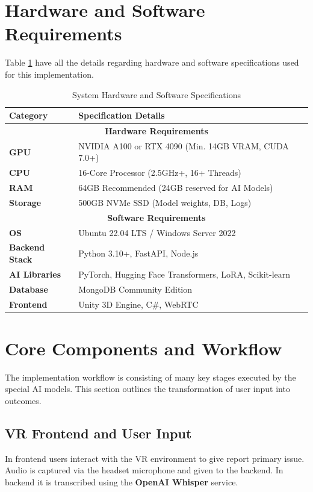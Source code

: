 \section{Hardware and Software Requirements}
Table \ref{tab:sys_reqs} have all the details regarding hardware and software specifications used for this implementation.

\begin{table}[H]
\centering
\renewcommand{\arraystretch}{1.4}
\begin{tabular}{|p{}|p{}|}
\hline
\rowcolor{gray!15} \textbf{Category} & \textbf{Specification Details} \\ \hline
\multicolumn{2}{|c|}{\textbf{Hardware Requirements}} \\ \hline
\textbf{GPU} & NVIDIA A100 or RTX 4090 (Min. 14GB VRAM, CUDA 7.0+) \\ \hline
\textbf{CPU} & 16-Core Processor (2.5GHz+, 16+ Threads) \\ \hline
\textbf{RAM} & 64GB Recommended (24GB reserved for AI Models) \\ \hline
\textbf{Storage} & 500GB NVMe SSD (Model weights, DB, Logs) \\ \hline
\multicolumn{2}{|c|}{\textbf{Software Requirements}} \\ \hline
\textbf{OS} & Ubuntu 22.04 LTS / Windows Server 2022 \\ \hline
\textbf{Backend Stack} & Python 3.10+, FastAPI, Node.js \\ \hline
\textbf{AI Libraries} & PyTorch, Hugging Face Transformers, LoRA, Scikit-learn \\ \hline
\textbf{Database} & MongoDB Community Edition \\ \hline
\textbf{Frontend} & Unity 3D Engine, C\#, WebRTC \\ \hline
\end{tabular}
\caption{System Hardware and Software Specifications}
\label{tab:sys_reqs}
\end{table}

\section{Core Components and Workflow}
The implementation workflow is consisting of many key stages executed by the special AI models. This section outlines the transformation of user input into outcomes.

\subsection{VR Frontend and User Input}
In frontend users interact with the VR environment to give report primary issue. Audio is captured via the headset microphone and given to the backend. In backend it is transcribed using the \textbf{OpenAI Whisper} service.


